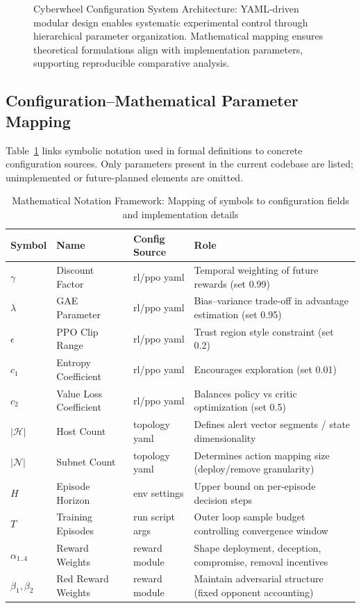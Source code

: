 \documentclass[12pt,oneside]{article}
\begin{document}
\begin{figure}[H]
\caption{Cyberwheel Configuration System Architecture: YAML-driven modular design enables systematic experimental control through hierarchical parameter organization. Mathematical mapping ensures theoretical formulations align with implementation parameters, supporting reproducible comparative analysis.}
\end{figure}

\subsection{Configuration--Mathematical Parameter Mapping}

Table~\ref{tab:config_mapping} links symbolic notation used in formal definitions to concrete configuration sources. Only parameters present in the current codebase are listed; unimplemented or future-planned elements are omitted.

\begin{table}[H]
\centering
\caption{Mathematical Notation Framework: Mapping of symbols to configuration fields and implementation details}
\label{tab:config_mapping}
\begin{tabular}{lllp{5.5cm}}
\rowcolor{cwBorder!30} \textbf{Symbol} & \textbf{Name} & \textbf{Config Source} & \textbf{Role} \\
\midrule
$\gamma$ & Discount Factor & rl/ppo yaml & Temporal weighting of future rewards (set 0.99) \\
$\lambda$ & GAE Parameter & rl/ppo yaml & Bias--variance trade-off in advantage estimation (set 0.95) \\
$\epsilon$ & PPO Clip Range & rl/ppo yaml & Trust region style constraint (set 0.2) \\
$c_1$ & Entropy Coefficient & rl/ppo yaml & Encourages exploration (set 0.01) \\
$c_2$ & Value Loss Coefficient & rl/ppo yaml & Balances policy vs critic optimization (set 0.5) \\
$|\mathcal{H}|$ & Host Count & topology yaml & Defines alert vector segments / state dimensionality \\
$|\mathcal{N}|$ & Subnet Count & topology yaml & Determines action mapping size (deploy/remove granularity) \\
$H$ & Episode Horizon & env settings & Upper bound on per-episode decision steps \\
$T$ & Training Episodes & run script args & Outer loop sample budget controlling convergence window \\
$\alpha_{1..4}$ & Reward Weights & reward module & Shape deployment, deception, compromise, removal incentives \\
$\beta_{1},\beta_{2}$ & Red Reward Weights & reward module & Maintain adversarial structure (fixed opponent accounting) \\
\bottomrule
\end{tabular}
\end{table}
\end{document}
